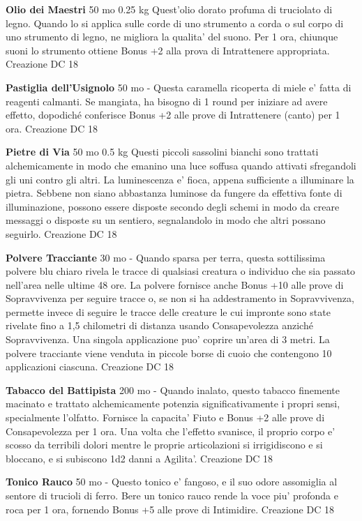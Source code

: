 \documentclass[a4paper,11pt,twoside,openany]{dndbook}
\begin{document}
{\textbf{Olio dei Maestri} 50 mo 0.25 kg Quest'olio dorato profuma di truciolato di legno. Quando lo si applica sulle corde di uno strumento a corda o sul corpo di uno strumento di legno, ne migliora la qualita' del suono. Per 1 ora, chiunque suoni lo strumento ottiene Bonus +2 alla prova di Intrattenere appropriata. Creazione DC 18

\textbf{Pastiglia dell'Usignolo} 50 mo - Questa caramella ricoperta di miele e' fatta di reagenti calmanti. Se mangiata, ha bisogno di 1 round per iniziare ad avere effetto, dopodiché conferisce Bonus +2 alle prove di Intrattenere (canto) per 1 ora. Creazione DC 18

\textbf{Pietre di Via} 50 mo 0.5 kg Questi piccoli sassolini bianchi sono trattati alchemicamente in modo che emanino una luce soffusa quando attivati sfregandoli gli uni contro gli altri. La luminescenza e' fioca, appena sufficiente a illuminare la pietra. Sebbene non siano abbastanza luminose da fungere da effettiva fonte di illuminazione, possono essere disposte secondo degli schemi in modo da creare messaggi o disposte su un sentiero, segnalandolo in modo che altri possano seguirlo. Creazione DC 18

\textbf{Polvere Tracciante} 30 mo - Quando sparsa per terra, questa sottilissima polvere blu chiaro rivela le tracce di qualsiasi creatura o individuo che sia passato nell'area nelle ultime 48 ore. La polvere fornisce anche Bonus +10 alle prove di Sopravvivenza per seguire tracce o, se non si ha addestramento in Sopravvivenza, permette invece di seguire le tracce delle creature le cui impronte sono state rivelate fino a 1,5 chilometri di distanza usando Consapevolezza anziché Sopravvivenza. Una singola applicazione puo' coprire un'area di 3 metri. La polvere tracciante viene venduta in piccole borse di cuoio che contengono 10 applicazioni ciascuna. Creazione DC 18

\textbf{Tabacco del Battipista} 200 mo - Quando inalato, questo tabacco finemente macinato e trattato alchemicamente potenzia significativamente i propri sensi, specialmente l'olfatto. Fornisce la capacita' Fiuto e Bonus +2 alle prove di Consapevolezza per 1 ora. Una volta che l'effetto svanisce, il proprio corpo e' scosso da terribili dolori mentre le proprie articolazioni si irrigidiscono e si bloccano, e si subiscono 1d2 danni a Agilita'. Creazione DC 18

\textbf{Tonico Rauco} 50 mo - Questo tonico e' fangoso, e il suo odore assomiglia al sentore di trucioli di ferro. Bere un tonico rauco rende la voce piu' profonda e roca per 1 ora, fornendo Bonus +5 alle prove di Intimidire. Creazione DC 18

}
\end{document}
